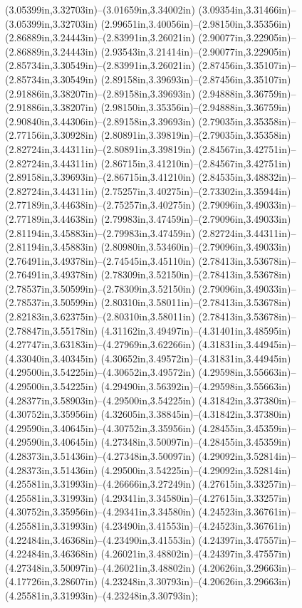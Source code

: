 (3.05399in,3.32703in)--(3.01659in,3.34002in) (3.09354in,3.31466in)--(3.05399in,3.32703in) (2.99651in,3.40056in)--(2.98150in,3.35356in) (2.86889in,3.24443in)--(2.83991in,3.26021in) (2.90077in,3.22905in)--(2.86889in,3.24443in) (2.93543in,3.21414in)--(2.90077in,3.22905in) (2.85734in,3.30549in)--(2.83991in,3.26021in) (2.87456in,3.35107in)--(2.85734in,3.30549in) (2.89158in,3.39693in)--(2.87456in,3.35107in) (2.91886in,3.38207in)--(2.89158in,3.39693in) (2.94888in,3.36759in)--(2.91886in,3.38207in) (2.98150in,3.35356in)--(2.94888in,3.36759in) (2.90840in,3.44306in)--(2.89158in,3.39693in) (2.79035in,3.35358in)--(2.77156in,3.30928in) (2.80891in,3.39819in)--(2.79035in,3.35358in) (2.82724in,3.44311in)--(2.80891in,3.39819in) (2.84567in,3.42751in)--(2.82724in,3.44311in) (2.86715in,3.41210in)--(2.84567in,3.42751in) (2.89158in,3.39693in)--(2.86715in,3.41210in) (2.84535in,3.48832in)--(2.82724in,3.44311in) (2.75257in,3.40275in)--(2.73302in,3.35944in) (2.77189in,3.44638in)--(2.75257in,3.40275in) (2.79096in,3.49033in)--(2.77189in,3.44638in) (2.79983in,3.47459in)--(2.79096in,3.49033in) (2.81194in,3.45883in)--(2.79983in,3.47459in) (2.82724in,3.44311in)--(2.81194in,3.45883in) (2.80980in,3.53460in)--(2.79096in,3.49033in) (2.76491in,3.49378in)--(2.74545in,3.45110in) (2.78413in,3.53678in)--(2.76491in,3.49378in) (2.78309in,3.52150in)--(2.78413in,3.53678in) (2.78537in,3.50599in)--(2.78309in,3.52150in) (2.79096in,3.49033in)--(2.78537in,3.50599in) (2.80310in,3.58011in)--(2.78413in,3.53678in) (2.82183in,3.62375in)--(2.80310in,3.58011in) (2.78413in,3.53678in)--(2.78847in,3.55178in) (4.31162in,3.49497in)--(4.31401in,3.48595in) (4.27747in,3.63183in)--(4.27969in,3.62266in) (4.31831in,3.44945in)--(4.33040in,3.40345in) (4.30652in,3.49572in)--(4.31831in,3.44945in) (4.29500in,3.54225in)--(4.30652in,3.49572in) (4.29598in,3.55663in)--(4.29500in,3.54225in) (4.29490in,3.56392in)--(4.29598in,3.55663in) (4.28377in,3.58903in)--(4.29500in,3.54225in) (4.31842in,3.37380in)--(4.30752in,3.35956in) (4.32605in,3.38845in)--(4.31842in,3.37380in) (4.29590in,3.40645in)--(4.30752in,3.35956in) (4.28455in,3.45359in)--(4.29590in,3.40645in) (4.27348in,3.50097in)--(4.28455in,3.45359in) (4.28373in,3.51436in)--(4.27348in,3.50097in) (4.29092in,3.52814in)--(4.28373in,3.51436in) (4.29500in,3.54225in)--(4.29092in,3.52814in) (4.25581in,3.31993in)--(4.26666in,3.27249in) (4.27615in,3.33257in)--(4.25581in,3.31993in) (4.29341in,3.34580in)--(4.27615in,3.33257in) (4.30752in,3.35956in)--(4.29341in,3.34580in) (4.24523in,3.36761in)--(4.25581in,3.31993in) (4.23490in,3.41553in)--(4.24523in,3.36761in) (4.22484in,3.46368in)--(4.23490in,3.41553in) (4.24397in,3.47557in)--(4.22484in,3.46368in) (4.26021in,3.48802in)--(4.24397in,3.47557in) (4.27348in,3.50097in)--(4.26021in,3.48802in) (4.20626in,3.29663in)--(4.17726in,3.28607in) (4.23248in,3.30793in)--(4.20626in,3.29663in) (4.25581in,3.31993in)--(4.23248in,3.30793in);
